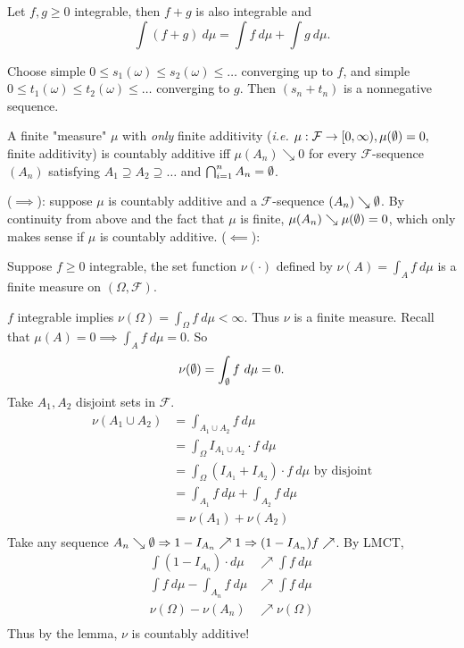 \documentclass[class=article,crop=false]{standalone}
\begin{document}
\begin{coro}[1 of LMCT]
Let $ f,g \geq 0$ integrable, then  $ f+g$ is also integrable and 
 \[
	 \int (f+g) \ d \mu=\int f\ d \mu + \int g  \ d \mu
.\] 
\end{coro}
\begin{prf}
	Choose simple $ 0\leq s_1(\omega) \leq s_2(\omega) \leq \ldots$ converging up to $ f$, and simple  $ 0\leq t_1(\omega)\leq t_2(\omega)\leq \ldots$ converging to $ g$. Then  $ (s_n+ t_n)$ is a nonnegative sequence.
\end{prf}

\begin{lem}[]
	A finite "measure" $ \mu$ with \emph{only} finite additivity (\emph{i.e.} $ \mu: \mathcal{F} \to [0,\infty), \mu( \emptyset) =0,$ finite additivity) is countably additive iff $ \mu(A_n) \searrow 0$ for every $ \mathcal{F}$-sequence $ (A_n)$ satisfying $ A_1 \supseteq A_2 \supseteq \ldots$ and $ \bigcap_{ i= 1}^{ n} A_n = \emptyset$. 
\end{lem}
\begin{prf}
	($ \implies$): suppose $ \mu$ is countably additive and a $ \mathcal{F}$-sequence $ (A_n) \searrow \emptyset$. By continuity from above and the fact that $ \mu$ is finite, $ \mu(A_n) \searrow \mu( \emptyset)=0$, which only makes sense if $ \mu$ is countably additive.
	($ \impliedby$): 
\end{prf}

\begin{coro}[2 of LMCT]
	Suppose $ f\geq 0$ integrable, the set function  $ \nu( \cdot )$ defined by $ \nu(A) = \int_A f \ d \mu$ is a finite measure on $ (\Omega,\mathcal{F})$.
\end{coro}
\begin{prf}
	$ f$ integrable implies  $ \nu(\Omega)=\int_{\Omega} f \ d \mu < \infty$. Thus $ \nu$ is a finite measure. Recall that  $ \mu(A)=0 \implies \int_A f \ d \mu =0$. So
	\[
		\nu( \emptyset) = \int_{ \emptyset} f\ d \mu=0
	.\] 
	Take $ A_1, A_2$ disjoint sets in $ \mathcal{F}$. 
	\begin{align*}
		\nu(A_1 \cup A_2) &= \int_{A_1 \cup A_2} f\ d \mu\\
		&= \int_{\Omega} I_{A_1 \cup A_2} \cdot  f\ d \mu \\
		&= \int_{\Omega} (I_{A_1} + I_{A_2}) \cdot  f\ d \mu \text{ by disjoint} \\
		&= \int_{A_1} f\ d \mu + \int_{A_2} f\ d \mu \\
		&= \nu(A_1)+ \nu(A_2) \\
	\end{align*}
	Take any sequence $ A_n \searrow \emptyset \Rightarrow 1- I_{A_n} \nearrow 1 \Rightarrow (1-I_{A_n})f \nearrow$. By LMCT, 
	\begin{align*}
		\int (1-I_{A_n}) \cdot d \mu &\nearrow \int f\ d \mu\\
		\int f\ d \mu - \int_{A_n} f\ d \mu &\nearrow \int f\ d \mu\\
		\nu(\Omega)-\nu(A_n) &\nearrow \nu(\Omega)\\
	\end{align*}
	Thus by the lemma, $ \nu$ is countably additive!
\end{prf}
\end{document}
